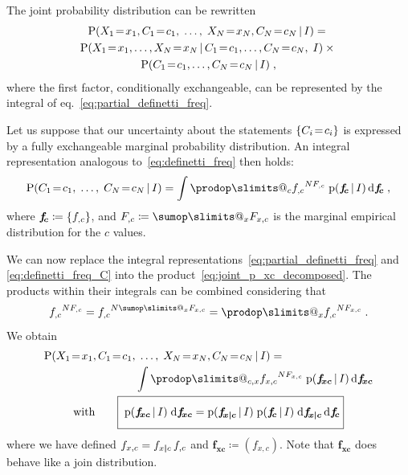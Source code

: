 \documentclass[\ifafour a4paper,12pt,\else a5paper,10pt,\fi%
onecolumn,oneside,article,%
british%
]{memoir}
\makeatletter
\theoremstyle{remark}
\theoremstyle{innote}
\def\sum{\DOTSI\sumop\slimits@}
\def\prod{\DOTSI\prodop\slimits@}
\newcommand*{\di}{\mathrm{d}}%
\newcommand*{\defd}{\coloneqq}
\DeclarePairedDelimiter\set{\{}{\}}
\newcommand*{\pf}{\mathrm{p}}%
\newcommand*{\p}{\mathrm{P}}%
\renewcommand*{\|}[1][]{\nonscript\,#1\vert\nonscript\,\mathopen{}}
\newcommand*{\eqn}{eq.}%
\renewcommand*{\=}{\TextOrMath\texteq\eq}
\newcommand*{\X}[1]{X_{#1}}
\newcommand*{\x}[1]{x_{#1}}
\newcommand*{\C}[1]{C_{#1}}
\newcommand*{\cc}[1]{c_{#1}}
\newcommand*{\fxc}{\bm{f_{\!x\bcond c}}}
\newcommand*{\fc}{\bm{f_{\!c}}}
\newcommand*{\fj}{\bm{f_{\!xc}}}
\newcommand*{\bcond}[1][]{\nonscript\,#1\bm{\vert}\nonscript\;\mathopen{}}
\makeatother
\begin{document}
The joint probability distribution can be rewritten
\begin{multline}
  \label{eq:joint_p_xc_decomposed}
  \p( \X{1}\=\x{1}, \C{1}\=\cc{1},\; \dotsc,\;  \X{N}\=\x{N},\C{N}\=\cc{N}
  \| I) ={}\\
\p( \X{1}\=\x{1}, \dotsc, \X{N}\=\x{N}  \|
\C{1}\=\cc{1}, \dotsc,\C{N}\=\cc{N},\;    I)
\times{}\\
\p(\C{1}\=\cc{1}, \dotsc,\C{N}\=\cc{N}  \|    I)
  \;,
\end{multline}
where the first factor, conditionally exchangeable, can be represented by
the integral of \eqn~\eqref{eq:partial_definetti_freq}.

Let us suppose that our uncertainty about the statements
$\set{\C{i}\=\cc{i}}$ is expressed by a fully exchangeable marginal
probability distribution. An integral representation analogous
to~\eqref{eq:definetti_freq} then holds:
\begin{equation}
  \label{eq:definetti_freq_C}
  \p( \C{1}\=\cc{1},\; \dotsc, \; \C{N}\=\cc{N} \| I) =
\int\prod_{c} {f_{,c}}^{N F_{,c}}\;   \pf(\fc \| I)\,\di\fc \;,
\end{equation}
where $\fc \defd \set{f_{,c}}$, and $F_{,c} \defd \sum_{x} F_{x,c}$ is the
marginal empirical distribution for the $c$ values.


We can now replace the integral
representations~\eqref{eq:partial_definetti_freq} and
\eqref{eq:definetti_freq_C} into the
product~\eqref{eq:joint_p_xc_decomposed}. The products within their
integrals can be combined considering that
\begin{equation}
  \label{eq:develop_prodfc}
  {f_{,c}}^{N F_{,c}} = {f_{,c}}^{N \sum_{x}F_{x,c}} =
  \prod_{x} {f_{,c}}^{N F_{x,c}} \;.
\end{equation}
We obtain
\begin{subequations}
  \label{eq:result}
  \begin{gather}
    \begin{multlined}[b][0.85\linewidth]
\p( \X{1}\=\x{1}, \C{1}\=\cc{1},\; \dotsc,\;  \X{N}\=\x{N},\C{N}\=\cc{N}
\| I) ={}\\
\int\prod_{c,x} {f_{x,c}}^{N F_{x, c}}\;  \pf(\fj\|I)\,\di\fj
\end{multlined}
\\
  \label{eq:factorizable}
\text{with}\qquad \boxed{\;\vphantom{\int}\pf(\fj\|I)\;\di\fj =
\pf(\fxc \| I)  \;
\pf(\fc \| I) \;\di\fxc\,\di\fc }
\end{gather}
\end{subequations}
where we have defined $f_{x,c} = f_{x \bcond c}\, f_{,c}$ and
$\fj \defd (f_{x,c})$. Note that $\fj$ does behave like a join
distribution.
\end{document}
